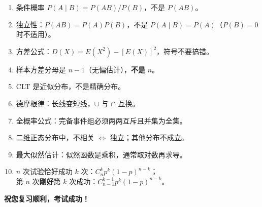 \documentclass[12pt, a4paper]{article}
\begin{document}
\begin{tcolorbox}[warnbox, title={易错点提醒}]
    \begin{enumerate}
        \item 条件概率 $P(A\mid B)=P(AB)/P(B)$，不是 $P(AB)$。
        \item 独立性：$P(AB)=P(A)P(B)$，不是 $P(A\mid B)=P(A)$（$P(B)=0$ 时不适用）。
        \item 方差公式：$D(X)=E(X^2)-[E(X)]^2$，符号不要搞错。
        \item 样本方差分母是 $n-1$（无偏估计），\textbf{不是} $n$。
        \item CLT 是近似分布，不是精确分布。
        \item 德摩根律：长线变短线，$\cup$ 与 $\cap$ 互换。
        \item 全概率公式：完备事件组必须两两互斥且并集为全集。
        \item 二维正态分布中，不相关 $\Leftrightarrow$ 独立；其他分布不成立。
        \item 最大似然估计：似然函数是乘积，通常取对数再求导。
        \item $n$ 次试验恰好成功 $k$ 次：$C_n^k p^k(1-p)^{n-k}$；\\
              第 $n$ 次\textbf{刚好}第 $k$ 次成功：$C_{n-1}^{k-1}p^k(1-p)^{n-k}$。
    \end{enumerate}
\end{tcolorbox}

\vspace{1cm}
\begin{center}
    {\large\bfseries\color{mainblue}祝您复习顺利，考试成功！}
\end{center}
\end{document}
